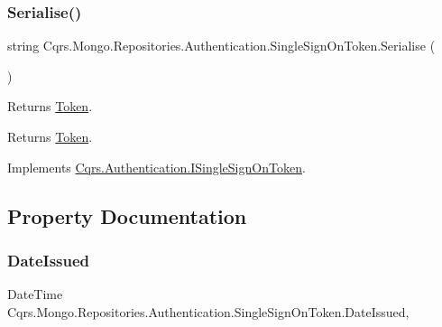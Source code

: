 \subsubsection{\texorpdfstring{Serialise()}{Serialise()}}
{\footnotesize\ttfamily string Cqrs.\+Mongo.\+Repositories.\+Authentication.\+Single\+Sign\+On\+Token.\+Serialise (\begin{DoxyParamCaption}{ }\end{DoxyParamCaption})}



Returns \hyperlink{classCqrs_1_1Mongo_1_1Repositories_1_1Authentication_1_1SingleSignOnToken_a48105fdf07433e74837cdc922d0b2d1f_a48105fdf07433e74837cdc922d0b2d1f}{Token}. 

\begin{DoxyReturn}{Returns}
\hyperlink{classCqrs_1_1Mongo_1_1Repositories_1_1Authentication_1_1SingleSignOnToken_a48105fdf07433e74837cdc922d0b2d1f_a48105fdf07433e74837cdc922d0b2d1f}{Token}.
\end{DoxyReturn}


Implements \hyperlink{interfaceCqrs_1_1Authentication_1_1ISingleSignOnToken_af34e8c0b052865d687064d3381bfbcdb_af34e8c0b052865d687064d3381bfbcdb}{Cqrs.\+Authentication.\+I\+Single\+Sign\+On\+Token}.



\subsection{Property Documentation}
\mbox{\label{classCqrs_1_1Mongo_1_1Repositories_1_1Authentication_1_1SingleSignOnToken_a92a25011e2a4a44e5fb99c4ee9f75f4d_a92a25011e2a4a44e5fb99c4ee9f75f4d}} 
\subsubsection{\texorpdfstring{Date\+Issued}{DateIssued}}
{\footnotesize\ttfamily Date\+Time Cqrs.\+Mongo.\+Repositories.\+Authentication.\+Single\+Sign\+On\+Token.\+Date\+Issued\hspace{0.3cm}{\ttfamily [get]}, {\ttfamily [set]}}



